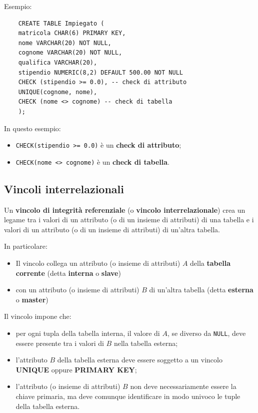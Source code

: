 Esempio:

\begin{verbatim}
	CREATE TABLE Impiegato (
	matricola CHAR(6) PRIMARY KEY,
	nome VARCHAR(20) NOT NULL,
	cognome VARCHAR(20) NOT NULL,
	qualifica VARCHAR(20),
	stipendio NUMERIC(8,2) DEFAULT 500.00 NOT NULL
	CHECK (stipendio >= 0.0), -- check di attributo
	UNIQUE(cognome, nome),
	CHECK (nome <> cognome) -- check di tabella
	);
\end{verbatim}

In questo esempio:

\begin{itemize}
	\item \texttt{CHECK(stipendio >= 0.0)} è un \textbf{check di attributo};
	\item \texttt{CHECK(nome <> cognome)} è un \textbf{check di tabella}.
\end{itemize}
\subsection{Vincoli interrelazionali}

Un \textbf{vincolo di integrità referenziale} (o \textbf{vincolo interrelazionale})
crea un legame tra i valori di un attributo (o di un insieme di attributi)
di una tabella e i valori di un attributo (o di un insieme di attributi)
di un'altra tabella.

In particolare:

\begin{itemize}
	
	\item Il vincolo collega un attributo (o insieme di attributi) $A$ della
	\textbf{tabella corrente} (detta \textbf{interna} o \textbf{slave})
	
	\item con un attributo (o insieme di attributi) $B$ di un'altra tabella
	(detta \textbf{esterna} o \textbf{master})
	
\end{itemize}

Il vincolo impone che:

\begin{itemize}
	
	\item per ogni tupla della tabella interna, il valore di $A$, se diverso da
	\texttt{NULL}, deve essere presente tra i valori di $B$ nella tabella esterna;
	
	\item l'attributo $B$ della tabella esterna deve essere soggetto a un vincolo
	\textbf{UNIQUE} oppure \textbf{PRIMARY KEY};
	
	\item l'attributo (o insieme di attributi) $B$ non deve necessariamente essere
	la chiave primaria, ma deve comunque identificare in modo univoco le tuple
	della tabella esterna.
	
\end{itemize}


